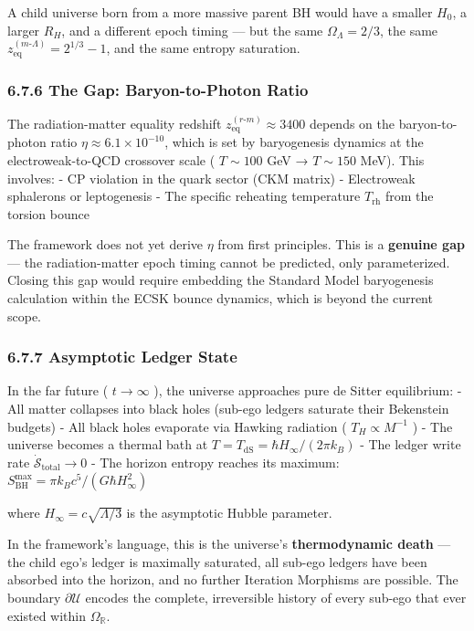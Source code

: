 \documentclass[11pt,a4paper]{article}
\theoremstyle{definition}
\theoremstyle{remark}
\begin{document}
A child universe born from a more massive parent BH would have a smaller $H_0$, a larger $R_H$, and a different epoch timing — but the same $\Omega_\Lambda = 2/3$, the same $z_{\text{eq}}^{(m\text{-}\Lambda)} = 2^{1/3} - 1$, and the same entropy saturation.

\subsubsection{6.7.6 The Gap: Baryon-to-Photon Ratio}

The radiation-matter equality redshift $z_{\text{eq}}^{(r\text{-}m)} \approx 3400$ depends on the baryon-to-photon ratio $\eta \approx 6.1 \times 10^{-10}$, which is set by baryogenesis dynamics at the electroweak-to-QCD crossover scale ( $T \sim 100$ GeV → $T \sim 150$ MeV). This involves:
- CP violation in the quark sector (CKM matrix)
- Electroweak sphalerons or leptogenesis
- The specific reheating temperature $T_{\text{rh}}$ from the torsion bounce

The framework does not yet derive $\eta$ from first principles. This is a \textbf{genuine gap} — the radiation-matter epoch timing cannot be predicted, only parameterized. Closing this gap would require embedding the Standard Model baryogenesis calculation within the ECSK bounce dynamics, which is beyond the current scope.

\subsubsection{6.7.7 Asymptotic Ledger State}

In the far future ( $t \to \infty$ ), the universe approaches pure de Sitter equilibrium:
- All matter collapses into black holes (sub-ego ledgers saturate their Bekenstein budgets)
- All black holes evaporate via Hawking radiation ( $T_H \propto M^{-1}$ )
- The universe becomes a thermal bath at $T = T_{\text{dS}} = \hbar H_\infty / (2\pi k_B)$
- The ledger write rate $\dot{\mathcal{S}}_{\text{total}} \to 0$
- The horizon entropy reaches its maximum: $S_{\text{BH}}^{\text{max}} = \pi k_B c^5 / (G\hbar H_\infty^2)$

where $H_\infty = c\sqrt{\Lambda/3}$ is the asymptotic Hubble parameter.

In the framework's language, this is the universe's \textbf{thermodynamic death} — the child ego's ledger is maximally saturated, all sub-ego ledgers have been absorbed into the horizon, and no further Iteration Morphisms are possible. The boundary $\partial\mathcal{U}$ encodes the complete, irreversible history of every sub-ego that ever existed within $\Omega_{\mathbb{R}}$.
\end{document}
